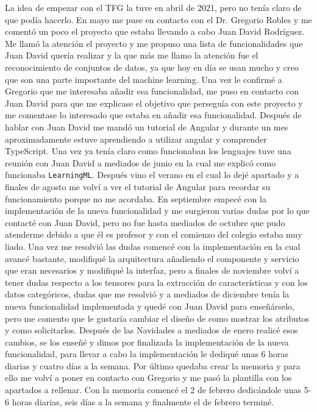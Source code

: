 \documentclass[a4paper, 12pt]{book}
\begin{document}
La idea de empezar con el TFG la tuve en abril de 2021, pero no tenía claro de que podía hacerlo. En mayo me puse en contacto con el Dr. Gregorio Robles y me comentó un poco el proyecto que estaba llevando a cabo Juan David Rodríguez.
Me llamó la atención el proyecto y me propuso una lista de funcionalidades que Juan David quería realizar y la que más me llamo la atención fue el reconocimiento de conjuntos de datos, ya que hoy en día se usan mucho y creo que son una parte importante del machine learning. 
Una vez le confirmé a Gregorio que me interesaba añadir esa funcionalidad, me puso en contacto con Juan David para que me explicase el objetivo que perseguía con este proyecto y me comentase lo interesado que estaba en añadir esa funcionalidad.
Después de hablar con Juan David me mandó un tutorial de Angular y durante un mes aproximadamente estuve aprendiendo a utilizar angular y comprender TypeScript. Una vez ya tenía claro como funcionaban los lenguajes tuve una reunión con Juan David a mediados de junio en la cual me explicó como funcionaba \texttt{LearningML}.
Después vino el verano en el cual lo dejé apartado y a finales de agosto me volví a ver el tutorial de Angular para recordar su funcionamiento porque no me acordaba. En septiembre empecé con la implementación de la nueva funcionalidad y me surgieron varias dudas por lo que contacté con Juan David, pero no fue hasta mediados de octubre que pudo atenderme debido a que él es profesor y con el comienzo del colegio estaba muy liado.
Una vez me resolvió las dudas comencé con la implementación en la cual avancé bastante, modifiqué la arquitectura añadiendo el componente y servicio que eran necesarios y modifiqué la interfaz, pero a finales de noviembre volví a tener dudas respecto a los tensores para la extracción de características y con los datos categóricos, dudas que me resolvió y a mediados de diciembre tenía la nueva funcionalidad implementada y quedé con Juan David para enseñárselo, pero me comento que le gustaría cambiar el diseño de como mostrar los atributos y como solicitarlos. Después de las Navidades a mediados de enero realicé esos cambios, se los enseñé y dimos por finalizada la implementación de la nueva funcionalidad, para llevar a cabo la implementación le dediqué unas 6 horas diarias y cuatro días a la semana.
Por último quedaba crear la memoria y para ello me volví a poner en contacto con Gregorio y me pasó la plantilla con los apartados a rellenar. Con la memoria comencé el 2 de febrero dedicándole unas 5-6 horas diarias, seis días a la semana y finalmente el de febrero terminé.
\end{document}
